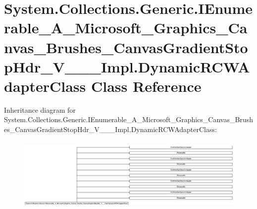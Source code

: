 \hypertarget{class_system_1_1_collections_1_1_generic_1_1_i_enumerable___a___microsoft___graphics___canvas___435b957e6308b33e2c46135e949c40b2}{}\section{System.\+Collections.\+Generic.\+I\+Enumerable\+\_\+\+A\+\_\+\+Microsoft\+\_\+\+Graphics\+\_\+\+Canvas\+\_\+\+Brushes\+\_\+\+Canvas\+Gradient\+Stop\+Hdr\+\_\+\+V\+\_\+\+\_\+\+\_\+\+Impl.\+Dynamic\+R\+C\+W\+Adapter\+Class Class Reference}
\label{class_system_1_1_collections_1_1_generic_1_1_i_enumerable___a___microsoft___graphics___canvas___435b957e6308b33e2c46135e949c40b2}
Inheritance diagram for System.\+Collections.\+Generic.\+I\+Enumerable\+\_\+\+A\+\_\+\+Microsoft\+\_\+\+Graphics\+\_\+\+Canvas\+\_\+\+Brushes\+\_\+\+Canvas\+Gradient\+Stop\+Hdr\+\_\+\+V\+\_\+\+\_\+\+\_\+\+Impl.\+Dynamic\+R\+C\+W\+Adapter\+Class\+:\begin{figure}[H]
\begin{center}
\leavevmode
\includegraphics[height=3.640662cm]{class_system_1_1_collections_1_1_generic_1_1_i_enumerable___a___microsoft___graphics___canvas___435b957e6308b33e2c46135e949c40b2}
\end{center}
\end{figure}
